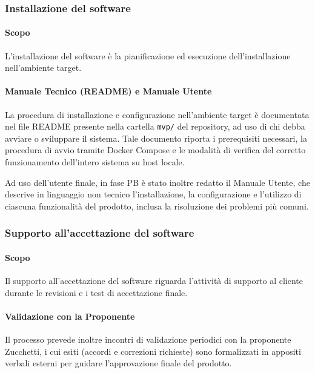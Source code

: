 \subsubsection{Installazione del software}

\paragraph{Scopo}

L'installazione del software è la pianificazione ed esecuzione dell'installazione nell'ambiente target.

\paragraph{Manuale Tecnico (README) e Manuale Utente}

La procedura di installazione e configurazione nell'ambiente target è documentata nel file README presente nella cartella \texttt{mvp/} del repository, ad uso di chi debba avviare o sviluppare il sistema. Tale documento riporta i prerequisiti necessari, la procedura di avvio tramite Docker Compose e le modalità di verifica del corretto funzionamento dell'intero sistema su host locale.

Ad uso dell'utente finale, in fase PB è stato inoltre redatto il Manuale Utente, che descrive in linguaggio non tecnico l'installazione, la configurazione e l'utilizzo di ciascuna funzionalità del prodotto, inclusa la risoluzione dei problemi più comuni.


\subsubsection{Supporto all'accettazione del software}

\paragraph{Scopo}

Il supporto all'accettazione del software riguarda l'attività di supporto al cliente durante le revisioni e i test di accettazione finale.

\paragraph{Validazione con la Proponente}

Il processo prevede inoltre incontri di validazione periodici con la proponente Zucchetti, i cui esiti (accordi e correzioni richieste) sono formalizzati in appositi verbali esterni per guidare l'approvazione finale del prodotto.